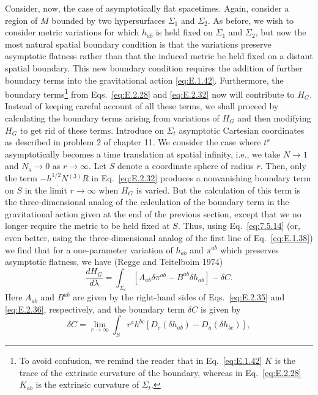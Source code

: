 Consider, now, the case of asymptotically flat spacetimes. Again, consider a region
of \(M\) bounded by two hypersurfaces \(\Sigma_1\) and \(\Sigma_2\). As before, we
wish to consider metric variations for which \(h_{ab}\) is held fixed on
\(\Sigma_1\) and \(\Sigma_2\), but now the most natural spatial boundary condition
is that the variations preserve asymptotic flatness rather than that the induced
metric be held fixed on a distant spatial boundary. This new boundary condition
requires the addition of further boundary terms into the gravitational action
\eqref{eq:E.1.42}. Furthermore, the boundary terms\footnote{To avoid confusion, we
remind the reader that in Eq.~\eqref{eq:E.1.42} \(K\) is the trace of the
extrinsic curvature of the boundary, whereas in Eq.~\eqref{eq:E.2.28} \(K_{ab}\)
is the extrinsic curvature of \(\Sigma_t\).} from Eqs.~\eqref{eq:E.2.28} and
\eqref{eq:E.2.32} now will contribute to \(H_G\). Instead of keeping careful
account of all these terms, we shall proceed by calculating the boundary terms
arising from variations of \(H_G\) and then modifying \(H_G\) to get rid of these
terms. Introduce on \(\Sigma_t\) asymptotic Cartesian coordinates as described in
problem 2 of chapter 11. We consider the case where \(t^a\) asymptotically becomes
a time translation at spatial infinity, i.e., we take \(N\to1\) and \(N_a\to0\) as
\(r\to\infty\). Let \(S\) denote a coordinate sphere of radius \(r\). Then, only
the term \(-h^{1/2}N{}^{(3)}R\) in Eq.~\eqref{eq:E.2.32} produces a nonvanishing
boundary term on \(S\) in the limit \(r\to\infty\) when \(H_G\) is varied. But the
calculation of this term is the three-dimensional analog of the calculation of the
boundary term in the gravitational action given at the end of the previous section,
except that we no longer require the metric to be held fixed at \(S\). Thus, using
Eq.~\eqref{eq:7.5.14} (or, even better, using the three-dimensional analog of the
first line of Eq.~\eqref{eq:E.1.38}) we find that for a one-parameter variation of
\(h_{ab}\) and \(\pi^{ab}\) which preserves asymptotic flatness, we have (Regge and
Teitelboim 1974)
\begin{equation}
  \frac{dH_G}{d\lambda}
    =\int_{\Sigma_t}\left[A_{ab}\delta\pi^{ab}-B^{ab}\delta h_{ab}\right]
      -\delta C.
  \tag{E.2.44}\label{eq:E.2.44}
\end{equation}
Here \(A_{ab}\) and \(B^{ab}\) are given by the right-hand sides of
Eqs.~\eqref{eq:E.2.35} and \eqref{eq:E.2.36}, respectively, and the boundary term
\(\delta C\) is given by
\begin{equation}
  \delta C=\lim_{r\to\infty}\int_S
    r^ah^{bc}\left[D_c(\delta h_{ab})-D_a(\delta h_{bc})\right],
  \tag{E.2.45}\label{eq:E.2.45}
\end{equation}
